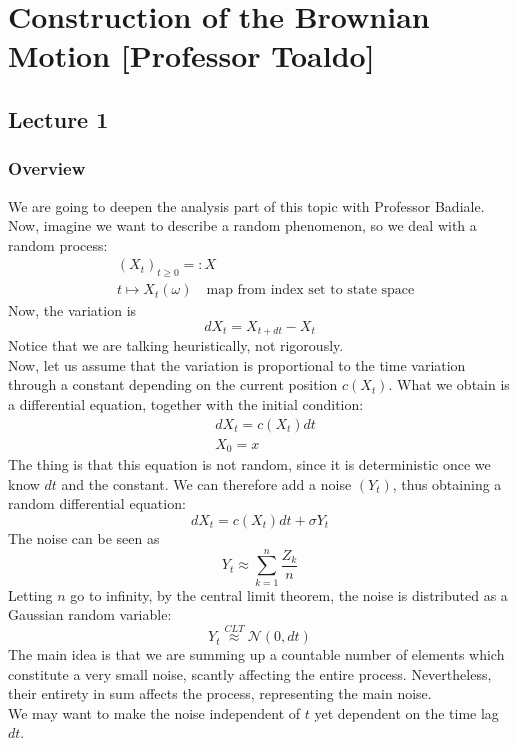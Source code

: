 \chapter{Construction of the Brownian Motion [Professor Toaldo]}
\section{Lecture 1}
\subsection{Overview}
We are going to deepen the analysis part of this topic with Professor Badiale. \\
Now, imagine we want to describe a random phenomenon, so we deal with a random process:
\begin{equation*}
    \begin{split}
        &(X_t)_{t \geq 0} =: X\\
        &t \mapsto X_t (\omega) \quad \text{map from index set to state space}
    \end{split}
\end{equation*}
Now, the variation is 
\begin{equation*}
    dX_t = X_{t+dt} - X_t 
\end{equation*}
Notice that we are talking heuristically, not rigorously. \\
Now, let us assume that the variation is proportional to the time variation through a constant depending on the current position $c(X_t)$. What we obtain is a differential equation, together with the initial condition:
\begin{equation*}
    \begin{split}
        & d X_t= c(X_t) dt  \\
        & X_0=x
    \end{split}
\end{equation*}
The thing is that this equation is not random, since it is deterministic once we know $dt$ and the constant. We can therefore add a noise $(Y_t)$, thus obtaining a random differential equation:
\begin{equation}
\label{eq 1}
    dX_t = c(X_t) dt + \sigma Y_t
\end{equation}
The noise can be seen as 
\begin{equation*}
    Y_t \approx \sum_{k=1}^n \frac{Z_k}{n}
\end{equation*}
Letting $n$ go to infinity, by the central limit theorem, the noise is distributed as a Gaussian random variable:
\begin{equation*}
    Y_t \stackrel{CLT}{\approx} \mathcal{N}(0,dt)
\end{equation*}
The main idea is that we are summing up a countable number of elements which constitute a very small noise, scantly affecting the entire process. Nevertheless, their entirety in sum affects the process, representing the main noise. \\     
We may want to make the noise independent of $t$ yet dependent on the time lag $dt$. 

